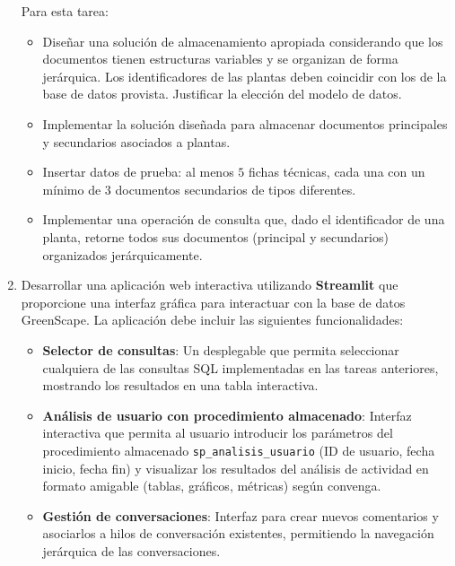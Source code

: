 \documentclass[10pt]{article}
\begin{document}
\begin{enumerate}
		Para esta tarea:
		
		\begin{itemize}
			\item Diseñar una solución de almacenamiento apropiada considerando que los documentos tienen estructuras variables y se organizan de forma jerárquica. Los identificadores de las plantas deben coincidir con los de la base de datos provista. Justificar la elección del modelo de datos.
			
			\item Implementar la solución diseñada para almacenar documentos principales y secundarios asociados a plantas.
			
			\item Insertar datos de prueba: al menos $5$ fichas técnicas, cada una con un mínimo de $3$ documentos secundarios de tipos diferentes.
			
			\item Implementar una operación de consulta que, dado el identificador de una planta, retorne todos sus documentos (principal y secundarios) organizados jerárquicamente.
		\end{itemize}
		
		\item Desarrollar una aplicación web interactiva utilizando \textbf{Streamlit} que proporcione una interfaz gráfica para interactuar con la base de datos GreenScape. La aplicación debe incluir las siguientes funcionalidades:
		
		\begin{itemize}
			\item \textbf{Selector de consultas}: Un desplegable que permita seleccionar cualquiera de las consultas SQL implementadas en las tareas anteriores, mostrando los resultados en una tabla interactiva.
			
			\item \textbf{Análisis de usuario con procedimiento almacenado}: Interfaz interactiva que permita al usuario introducir los parámetros del procedimiento almacenado \texttt{sp\_analisis\_usuario} (ID de usuario, fecha inicio, fecha fin) y visualizar los resultados del análisis de actividad en formato amigable (tablas, gráficos, métricas) según convenga.
			
			\item \textbf{Gestión de conversaciones}: Interfaz para crear nuevos comentarios y asociarlos a hilos de conversación existentes, permitiendo la navegación jerárquica de las conversaciones.
			

\end{itemize}
\end{enumerate}
\end{document}
